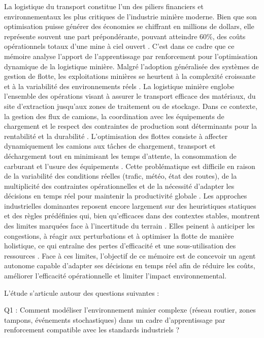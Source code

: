 \documentclass[11pt,a4paper]{report}
\begin{document}
La logistique du transport constitue l'un des piliers financiers et environnementaux les plus critiques de l'industrie minière moderne. Bien que son optimisation puisse générer des économies se chiffrant en millions de dollars, elle représente souvent une part prépondérante, pouvant atteindre 60\%, des coûts opérationnels totaux d'une mine à ciel ouvert \cite{Afrapoli2017}. C’est dans ce cadre que ce mémoire analyse l’apport de l’apprentissage par renforcement pour l’optimisation dynamique de la logistique minière. Malgré l’adoption généralisée des systèmes de gestion de flotte, les exploitations minières se heurtent à la complexité croissante et à la variabilité des environnements réels \cite{AlexandraMNewman2010, Afrapoli2017}. La logistique minière englobe l’ensemble des opérations visant à assurer le transport efficace des matériaux, du site d’extraction jusqu’aux zones de traitement ou de stockage. Dans ce contexte, la gestion des flux de camions, la coordination avec les équipements de chargement et le respect des contraintes de production sont déterminants pour la rentabilité et la durabilité \cite{Afrapoli2017}. L’optimisation des flottes consiste à affecter dynamiquement les camions aux tâches de chargement, transport et déchargement tout en minimisant les temps d’attente, la consommation de carburant et l’usure des équipements \cite{Alarie2002}. Cette problématique est difficile en raison de la variabilité des conditions réelles (trafic, météo, état des routes), de la multiplicité des contraintes opérationnelles et de la nécessité d’adapter les décisions en temps réel pour maintenir la productivité globale \cite{MarceloMorettiFioroni2008}. Les approches industrielles dominantes reposent encore largement sur des heuristiques statiques et des règles prédéfinies \cite{Alarie2002} qui, bien qu’efficaces dans des contextes stables, montrent des limites marquées face à l’incertitude du terrain \cite{ShivPrakashUpadhyay2017}. Elles peinent à anticiper les congestions, à réagir aux perturbations et à optimiser la flotte de manière holistique, ce qui entraîne des pertes d’efficacité et une sous-utilisation des ressources \cite{MiladAbolghasemian2020, BurakOzdemir2019}. Face à ces limites, l’objectif de ce mémoire est de concevoir un agent autonome capable d’adapter ses décisions en temps réel afin de réduire les coûts, améliorer l’efficacité opérationnelle et limiter l’impact environnemental.

L’étude s’articule autour des questions suivantes :

    Q1 : Comment modéliser l'environnement minier complexe (réseau routier, zones tampons, événements stochastiques) dans un cadre d'apprentissage par renforcement compatible avec les standards industriels ?
\end{document}
